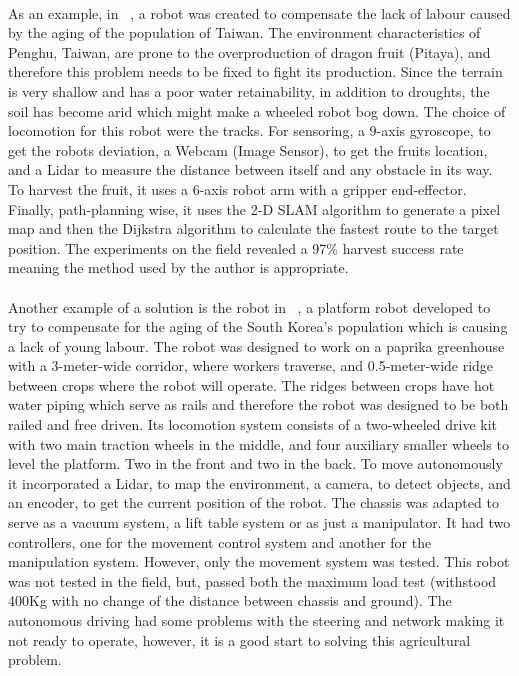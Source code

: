 \paragraph{}As an example, in ~\cite{10113871}, a robot was created to compensate the lack of labour caused by the aging of the population of Taiwan. 
The environment characteristics of Penghu, Taiwan, are prone to the overproduction of dragon fruit (Pitaya), and therefore this problem needs 
to be fixed to fight its production. Since the terrain is very shallow and has a poor water retainability, in addition to droughts, the soil 
has become arid which might make a wheeled robot bog down. The choice of locomotion for this robot were the tracks. For sensoring, a 9-axis 
gyroscope, to get the robots deviation, a Webcam (Image Sensor), to get the fruits location, and a Lidar to measure the distance between itself 
and any obstacle in its way. To harvest the fruit, it uses a 6-axis robot arm with a gripper end-effector. Finally, path-planning wise, it uses 
the 2-D SLAM algorithm to generate a pixel map and then the Dijkstra algorithm to calculate the fastest route to the target position. 
The experiments on the field revealed a 97\% harvest success rate meaning the method used by the author is appropriate.

\paragraph{}Another example of a solution is the robot in ~\cite{app12094335}, a platform robot developed to try to compensate for the aging of the South Korea’s 
population which is causing a lack of young labour. The robot was designed to work on a paprika greenhouse with a 3-meter-wide corridor, 
where workers traverse, and 0.5-meter-wide ridge between crops where the robot will operate. The ridges between crops have 
hot water piping which serve as rails and therefore the robot was designed to be both railed and free driven. Its locomotion system consists 
of a two-wheeled drive kit with two main traction wheels in the middle, and four auxiliary smaller wheels to level the platform. Two in the front and 
two in the back. To move autonomously it incorporated a Lidar, to map the environment, a camera, to detect objects, and an encoder, to get the 
current position of the robot. The chassis was adapted to serve as a vacuum system, a lift table system or as just a manipulator. It had two controllers, 
one for the movement control system and another for the manipulation system. However, only the movement system was tested. This robot was not 
tested in the field, but, passed both the maximum load test (withstood 400Kg with no change of the distance between chassis and ground). 
The autonomous driving had some problems with the steering and network making it not ready to operate, however, it is a good start to solving this agricultural problem.


